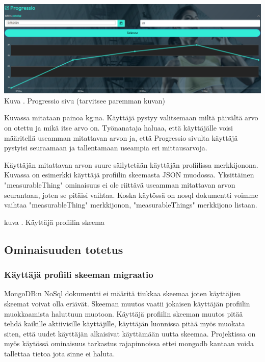 \documentclass[11pt,a4paper,titlepage,oneside]{article}
\begin{document}
\includegraphics[width =15cm]{src/public/progressiosingle.png}\\
Kuva \getImgCount {}. Progressio sivu (tarvitsee paremman kuvan)
\medskip

Kuvassa \theimgCounter {} mitataan painoa kg:na. Käyttäjä pystyy valitsemaan miltä päivältä arvo on otettu ja mikä itse arvo on.
Työnanataja haluaa, että käyttäjälle voisi määritellä useamman mitattavan arvon ja, 
että Progressio sivulta käyttäjä pystyisi seuraamaan ja tallentamaan useampia eri mittausarvoja.
\medskip


Käyttäjän mitattavan arvon suure säilytetään käyttäjän profiilissa merkkijonona. 
Kuvassa \nextImageCount {} on esimerkki käyttäjä profiilin skeemasta JSON muodossa.
Yksittäinen "measurableThing"{} ominaisuus ei ole riittävä useamman mitattavan arvon seurantaan, joten se pitäisi vaihtaa.
Koska käytössä on nosql dokumentti voimme vaihtaa "measurableThing"{} merkkijonon, "measurableThings"{} merkkijono listaan.
\bigskip



kuva \getImgCount {}. Käyttäjä profiilin skeema
\medskip



\subsection{Ominaisuuden totetus}


\subsubsection{Käyttäjä profiili skeeman migraatio}

MongoDB:n NoSql dokumentti ei määritä tiukkaa skeemaa joten käyttäjien skeemat voivat olla eriävät.
Skeeman muutos vaatii jokaisen käyttäjän profiilin muokkaamista haluttuun muotoon.
Käyttäjä profiilin skeeman muutos pitää tehdä kaikille aktiivisille käyttäjille, käyttäjän luonnissa pitää myös muokata siten, 
että uudet käyttäjän alkaisivat käyttämään uutta skeemaa.
Projektissa on myös käytössä ominaisuus tarkastus rajapinnoissa ettei mongodb kantaan voida tallettaa tietoa jota sinne ei haluta.
\medskip
\end{document}
